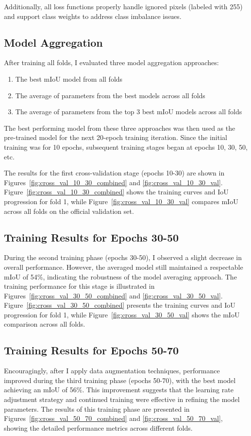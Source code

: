 \documentclass[]{article}
\begin{document}
Additionally, all loss functions properly handle ignored pixels (labeled with 255) and support class weights to address class imbalance issues.


\subsection{Model Aggregation}
After training all folds, I evaluated three model aggregation approaches:
\begin{enumerate}
    \item The best mIoU model from all folds
    \item The average of parameters from the best models across all folds
    \item The average of parameters from the top 3 best mIoU models across all folds
\end{enumerate}

The best performing model from these three approaches was then used as the pre-trained model for the next 20-epoch training iteration. Since the initial training was for 10 epochs, subsequent training stages began at epochs 10, 30, 50, etc.

The results for the first cross-validation stage (epochs 10-30) are shown in Figures~\ref{fig:cross_val_10_30_combined} and \ref{fig:cross_val_10_30_val}. Figure~\ref{fig:cross_val_10_30_combined} shows the training curves and IoU progression for fold 1, while Figure~\ref{fig:cross_val_10_30_val} compares mIoU across all folds on the official validation set.

\subsection{Training Results for Epochs 30-50}
During the second training phase (epochs 30-50), I observed a slight decrease in overall performance. However, the averaged model still maintained a respectable mIoU of 54\%, indicating the robustness of the model averaging approach. The training performance for this stage is illustrated in Figures~\ref{fig:cross_val_30_50_combined} and \ref{fig:cross_val_30_50_val}. Figure~\ref{fig:cross_val_30_50_combined} presents the training curves and IoU progression for fold 1, while Figure~\ref{fig:cross_val_30_50_val} shows the mIoU comparison across all folds.


\subsection{Training Results for Epochs 50-70}
Encouragingly, after I apply data augmentation techniques, performance improved during the third training phase (epochs 50-70), with the best model achieving an mIoU of 56\%. This improvement suggests that the learning rate adjustment strategy and continued training were effective in refining the model parameters. The results of this training phase are presented in Figures~\ref{fig:cross_val_50_70_combined} and \ref{fig:cross_val_50_70_val}, showing the detailed performance metrics across different folds.
\end{document}
